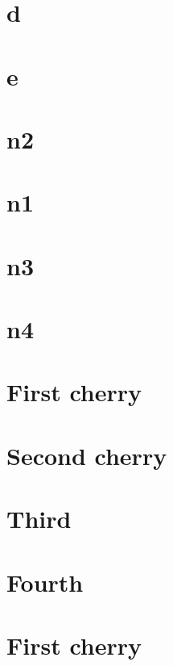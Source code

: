 \documentclass[]{book}
\theoremstyle{definition}
\theoremstyle{definition}
\theoremstyle{definition}
\theoremstyle{remark}
\begin{document}
\hypertarget{d}{%
\section{d}\label{d}}

\hypertarget{e}{%
\section{e}\label{e}}

\hypertarget{n2}{%
\section{n2}\label{n2}}

\hypertarget{n1}{%
\section{n1}\label{n1}}

\hypertarget{n3}{%
\section{n3}\label{n3}}

\hypertarget{n4}{%
\section{n4}\label{n4}}

\hypertarget{first-cherry}{%
\section{First cherry}\label{first-cherry}}

\hypertarget{second-cherry}{%
\section{Second cherry}\label{second-cherry}}

\hypertarget{third}{%
\section{Third}\label{third}}

\hypertarget{fourth}{%
\section{Fourth}\label{fourth}}

\hypertarget{first-cherry-1}{%
\section{First cherry}\label{first-cherry-1}}
\end{document}
